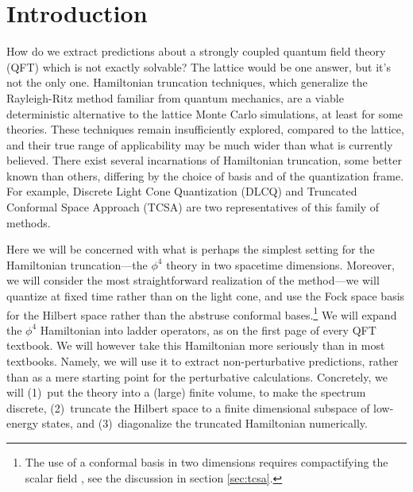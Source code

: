 \documentclass[11pt]{article}
\numberwithin{equation}{section}
\begin{document}
\newpage

{
\setlength{\parskip}{0.05in}
\renewcommand{\baselinestretch}{0.7}\normalsize
\tableofcontents
\renewcommand{\baselinestretch}{1.0}\normalsize
}

\setlength{\parskip}{0.1in}

\section{Introduction}

How do we extract predictions about a strongly coupled quantum field theory (QFT) which is not exactly solvable? The lattice would be one answer, but it's not the only one. Hamiltonian truncation techniques, which generalize the Rayleigh-Ritz method familiar from quantum mechanics, are a viable deterministic alternative to the lattice Monte Carlo simulations, at least for some theories. These techniques remain insufficiently explored, compared to the lattice, and their true range of applicability may be much wider than what is currently believed. There exist several incarnations of Hamiltonian truncation, some better known than others, differing by the choice of basis and of the quantization frame. For example, Discrete Light Cone Quantization (DLCQ) \cite{Brodsky:1997de} and Truncated Conformal Space Approach (TCSA) \cite{Yurov:1989yu} are two representatives of this family of methods.

Here we will be concerned with what is perhaps the simplest setting for the Hamiltonian truncation---the $\phi^4$ theory in two spacetime dimensions. Moreover, we will consider the most straightforward realization of the method---we will quantize at fixed time rather  than on the light cone, and use the Fock space basis for the Hilbert space rather than the abstruse conformal bases.\footnote{The use of a conformal basis in two dimensions requires compactifying the scalar field \cite{Coser:2014lla}, see the discussion in section \ref{sec:tcsa}.} We will expand the $\phi^4$ Hamiltonian into ladder operators, as on the first page of every QFT textbook. We will however take this Hamiltonian more seriously than in most textbooks. Namely, we will use it to extract non-perturbative predictions, rather than as a mere starting point for the perturbative calculations. Concretely, we will (1)~put the theory into a (large) finite volume, to make the spectrum discrete, (2)~truncate the Hilbert space to a finite dimensional subspace of low-energy states, and (3)~diagonalize the truncated Hamiltonian numerically.
\end{document}
